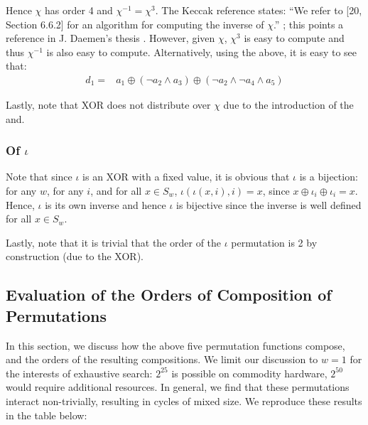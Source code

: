 \documentclass[10pt,twocolumn,twoside]{pnas-new}
\begin{document}
Hence $\chi$ has order 4 and $\chi^{-1} = \chi^{3}$. The Keccak reference states:
``We refer to [20, Section 6.6.2] for an algorithm for computing the inverse of $\chi$.''
\cite{Keccak3}; this points a reference in J. Daemen's thesis \cite{DaemenThesis}.
However, given $\chi$, $\chi^{3}$ is easy to compute and thus $\chi^{-1}$ is also
easy to compute. Alternatively, using the above, it is easy to see that:
\begin{align*}
    d_1 = & a_1 \oplus (\lnot a_2 \land a_3) \oplus (\lnot a_2 \land \lnot a_4 \land a_5)
\end{align*}

Lastly, note that XOR does not distribute over $\chi$ due to the
introduction of the and.

\subsubsection{Of $\iota$} \label{sec:p:i}


Note that since $\iota$ is an XOR with a fixed value, it is obvious that
$\iota$ is a bijection: for any $w$, for any $i$, and for all $x \in S_{w}$,
$\iota(\iota(x, i), i) = x$, since $x \oplus \iota_{i} \oplus \iota_{i} = x$.
Hence, $\iota$ is its own inverse and hence $\iota$ is bijective since the
inverse is well defined for all $x \in S_{w}$.

Lastly, note that it is trivial that the order of the $\iota$ permutation is
2 by construction (due to the XOR).

\subsection{Evaluation of the Orders of Composition of Permutations} \label{sec:p:composition}

In this section, we discuss how the above five permutation functions compose,
and the orders of the resulting compositions. We limit our discussion to $w=1$
for the interests of exhaustive search: $2^{25}$ is possible on commodity
hardware, $2^{50}$ would require additional resources. In general, we find that
these permutations interact non-trivially, resulting in cycles of mixed size.
We reproduce these results in the table below:
\end{document}
